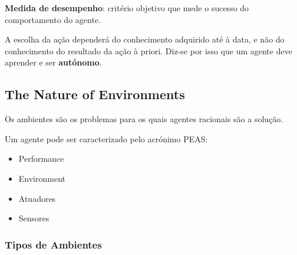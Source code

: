 \documentclass[12pt]{article}
\begin{document}
\textbf{Medida de desempenho}: critério objetivo que mede o sucesso do comportamento do agente.\vspace{10pt}

A escolha da ação dependerá do conhecimento adquirido até à data, e não do conhecimento do resultado da ação à priori. Diz-se por isso que um agente deve aprender e ser \textbf{autónomo}.

\subsection{The Nature of Environments}

Os ambientes são os problemas para os quais agentes racionais são a solução.

Um agente pode ser caracterizado pelo acrónimo PEAS:
\begin{itemize}[topsep=4pt, itemsep=0pt]
    \item Performance
    \item Environment
    \item Atuadores
    \item Sensores
\end{itemize}

\subsubsection{Tipos de Ambientes}
\end{document}
